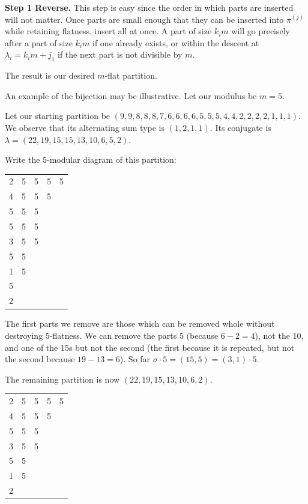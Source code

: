 \documentclass[11pt]{article}
\begin{document}
\textbf{Step 1 Reverse.} This step is easy since the order in which parts are inserted will not matter.  Once parts are small enough that they can be inserted into $\pi^{(j)}$ while retaining flatness, insert all at once.  A part of size $k_i m$ will go precisely after a part of size $k_i m$ if one already exists, or within the descent at $\lambda_i = k_i m+j_1$ if the next part is not divisible by $m$.

The result is our desired $m$-flat partition.



An example of the bijection may be illustrative.  Let our modulus be $m=5$.

Let our starting partition be $(9,9,8,8,8,7,6,6,6,6,5,5,5,4,4,2,2,2,2,1,1,1)$.  We observe that its alternating sum type is $(1,2,1,1)$.  Its conjugate is $\lambda = (22,19, 15,15, 13,10,6,5,2)$.  

Write the 5-modular diagram of this partition:

\begin{center}
\begin{tabular}{ccccc}
2 & 5 & 5 & 5 & 5 \\
4 & 5 & 5 & 5 & \\
5 & 5 & 5 & & \\
5 & 5 & 5 & & \\
3 & 5 & 5 & & \\
5 & 5 & & & \\
1 & 5 & & & \\
5 & & & & \\
2 & & & & 
\end{tabular}
\end{center}

The first parts we remove are those which can be removed whole without destroying 5-flatness.  We can remove the parts 5 (because $6-2=4$), not the 10, and one of the 15s but not the second (the first because it is repeated, but not the second because $19-13 = 6$).  So far $\sigma \cdot 5 = (15, 5) = (3,1)\cdot 5$.

The remaining partition is now $(22,19, 15,13,10,6,2)$.

\begin{center}
\begin{tabular}{ccccc}
2 & 5 & 5 & 5 & 5 \\
4 & 5 & 5 & 5 & \\
5 & 5 & 5 & & \\
3 & 5 & 5 & & \\
5 & 5 & & & \\
1 & 5 & & & \\
2 & & & & 
\end{tabular}
\end{center}
\end{document}
